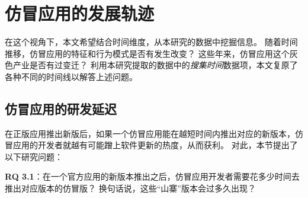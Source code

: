 \vspace{5mm}
\noindent{}

\section{仿冒应用的发展轨迹}
在这个视角下，本文希望结合时间维度，从本研究的数据中挖掘信息。
随着时间推移，仿冒应用的特征和行为模式是否有发生改变？
这些年来，仿冒应用这个灰色产业是否有过变迁？
利用本研究提取的数据中的\emph{搜集时间}数据项，本文复原了各种不同的时间线以解答上述问题。

\subsection{仿冒应用的研发延迟}
在正版应用推出新版后，如果一个仿冒应用能在越短时间内推出对应的新版本，仿冒应用的开发者就越有可能蹭上软件更新的热度，从而获利。
对此，本节提出了以下研究问题：

{\bf RQ 3.1}：在一个官方应用的新版本推出之后，仿冒应用开发者需要花多少时间去推出对应版本的仿冒版？
换句话说，这些``山寨''版本会过多久出现？

